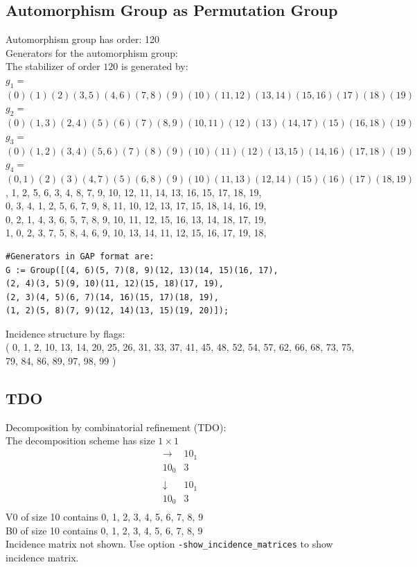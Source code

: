 
\subsection*{Automorphism Group as Permutation Group}
Automorphism group has order: 120\\
Generators for the automorphism group: \\
The stabilizer of order $120$ is generated by:\\
$g_{1} = $ $(0)(1)(2)(3, 5)(4, 6)(7, 8)(9)(10)(11, 12)(13, 14)(15, 16)(17)(18)(19)$\\
$g_{2} = $ $(0)(1, 3)(2, 4)(5)(6)(7)(8, 9)(10, 11)(12)(13)(14, 17)(15)(16, 18)(19)$\\
$g_{3} = $ $(0)(1, 2)(3, 4)(5, 6)(7)(8)(9)(10)(11)(12)(13, 15)(14, 16)(17, 18)(19)$\\
$g_{4} = $ $(0, 1)(2)(3)(4, 7)(5)(6, 8)(9)(10)(11, 13)(12, 14)(15)(16)(17)(18, 19)$\\

, 1, 2, 5, 6, 3, 4, 8, 7, 9, 10, 12, 11, 14, 13, 16, 15, 17, 18, 19, \\
0, 3, 4, 1, 2, 5, 6, 7, 9, 8, 11, 10, 12, 13, 17, 15, 18, 14, 16, 19, \\
0, 2, 1, 4, 3, 6, 5, 7, 8, 9, 10, 11, 12, 15, 16, 13, 14, 18, 17, 19, \\
1, 0, 2, 3, 7, 5, 8, 4, 6, 9, 10, 13, 14, 11, 12, 15, 16, 17, 19, 18, \\
\begin{verbatim}
#Generators in GAP format are:
G := Group([(4, 6)(5, 7)(8, 9)(12, 13)(14, 15)(16, 17), 
(2, 4)(3, 5)(9, 10)(11, 12)(15, 18)(17, 19), 
(2, 3)(4, 5)(6, 7)(14, 16)(15, 17)(18, 19), 
(1, 2)(5, 8)(7, 9)(12, 14)(13, 15)(19, 20)]);
\end{verbatim}
Incidence structure by flags: \\
( 0, 1, 2, 10, 13, 14, 20, 25, 26, 31, 33, 37, 41, 45, 48, 52, 54, 57, 62, 66, 68, 73, 75, 79, 84, 86, 89, 97, 98, 99 )\\
\subsection*{TDO}
Decomposition by combinatorial refinement (TDO):\\
The decomposition scheme has size $1 \times 1$\\
$$
\begin{array}{r|*{1}{r}}
\rightarrow  & 10_{1}\\
\hline
10_{0} & 3\\
\end{array}
$$
$$
\begin{array}{r|*{1}{r}}
\downarrow  & 10_{1}\\
\hline
10_{0} & 3\\
\end{array}
$$
V0 of size 10 contains 0, 1, 2, 3, 4, 5, 6, 7, 8, 9\\
B0 of size 10 contains 0, 1, 2, 3, 4, 5, 6, 7, 8, 9\\
Incidence matrix not shown. Use option \verb'-show_incidence_matrices' to show incidence matrix.\\
